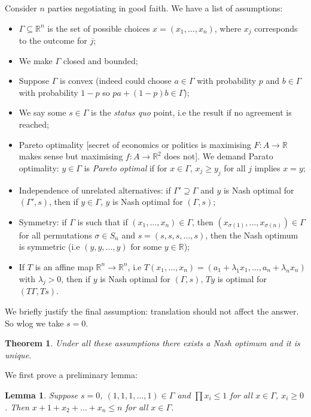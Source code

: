 \documentclass[a4paper, 10pt, twocolumn]{amsart}
\newtheorem*{theorem}{Theorem}
\newtheorem*{lemma}{Lemma}
\theoremstyle{definition}
\newcommand{\bb}[1]{\mathbb{#1}}
\newcommand{\sbs}[0]{\subseteq}
\newcommand{\1}{\mathbbm{1}}
\begin{document}
Consider $n$ parties negotiating in good faith. We have a list of assumptions:
\begin{itemize}
    \item $\Gamma \sbs \bb{R}^n$ is the set of possible choices $x = (x_1,\ldots,x_n)$, where $x_j$ corresponds to the outcome for $j$;
    \item We make $\Gamma$ closed and bounded;
    \item Suppose $\Gamma$ is convex (indeed could choose $a \in \Gamma$ with probability $p$ and $b \in \Gamma$ with probability $1-p$ so $pa+(1-p)b \in \Gamma$);
    \item We say some $s \in \Gamma$ is the \textit{status quo} point, i.e the result if no agreement is reached;
    \item Pareto optimality [secret of economics or politics is maximising $F:A \to \bb{R}$ makes sense but maximising $f:A \to \bb{R}^2$ does not]. We demand Parato optimality: $y \in \Gamma$ is \textit{Pareto optimal} if for $x \in \Gamma$, $x_j \ge y_j$ for all $j$ implies $x=y$;
    \item Independence of unrelated alternatives: if $\Gamma' \supseteq \Gamma$ and $y$ is Nash optimal for $(\Gamma',s)$, then if $y \in \Gamma$, $y$ is Nash optimal for $(\Gamma,s)$;
    \item Symmetry: if $\Gamma$ is such that if $(x_1,\ldots,x_n) \in \Gamma$, then $(x_{\sigma(1)},\ldots,x_{\sigma(n)}) \in \Gamma$ for all permutations $\sigma \in S_n$ and $s = (s,s,s,\ldots,s)$, then the Nash optimum is symmetric (i.e $(y,y,\ldots,y)$ for some $y \in \bb{R}$); 
    \item If $T$ is an affine map $\bb{R}^n \to \bb{R}^n$, i.e $T(x_1,\ldots,x_n) = (a_1+\lambda_1 x_1,\ldots,a_n+\lambda_n x_n)$ with $\lambda_j>0$, then if $y$ is Nash optimal for $(\Gamma,s)$, $Ty$ is optimal for $(T\Gamma,Ts)$. 
\end{itemize}

We briefly justify the final assumption: translation should not affect the answer. So wlog we take $s=0$. 

\begin{theorem}
    Under all these assumptions there exists a Nash optimum and it is unique.
\end{theorem}





We first prove a preliminary lemma:

\begin{lemma}
    Suppose $s=0$, $(1,1,1,\ldots,1) \in \Gamma$ and $\prod x_i \le 1$ for all $x\in \Gamma$, $x_i \ge 0$. Then $x+1+x_2+\ldots+x_n \le n$ for all $x \in \Gamma$.
\end{lemma}
\end{document}
